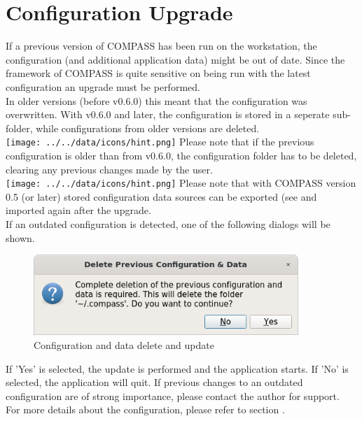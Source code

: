 
\section{Configuration Upgrade}


If a previous version of COMPASS has been run on the workstation, the configuration (and additional application data) might be out of date. Since the framework of COMPASS is quite sensitive on being run with the latest configuration an upgrade must be performed. \\

In older versions (before v0.6.0) this meant that the configuration was overwritten. With v0.6.0 and later, the configuration is stored in a seperate sub-folder, while configurations from older versions are deleted. \\

\texttt{[image: ../../data/icons/hint.png]} Please note that if the previous configuration is older than from v0.6.0, the configuration folder has to be deleted, clearing any previous changes made by the user. \\

\texttt{[image: ../../data/icons/hint.png]} Please note that with COMPASS version 0.5 (or later) stored configuration data sources can be exported (see  and imported again after the upgrade. \\

If an outdated configuration is detected, one of the following dialogs will be shown.

\begin{figure}[H]
    \includegraphics[width=10cm]{../screenshots/config_data_delete_update.png}
  \caption{Configuration and data delete and update}
\end{figure}

If 'Yes' is selected, the update is performed and the application starts. If 'No' is selected, the application will quit. If previous changes to an outdated configuration are of strong importance, please contact the author for support. \\

For more details about the configuration, please refer to section .
